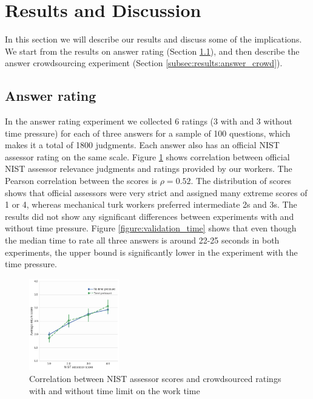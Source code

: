 \documentclass[11pt,letterpaper]{article}
\begin{document}
\section{Results and Discussion}
\label{sec:results}

In this section we will describe our results and discuss some of the implications.
We start from the results on answer rating (Section \ref{subsec:results:answer_rating}), and then describe the answer crowdsourcing experiment (Section \ref{subsec:results:answer_crowd}).

\subsection{Answer rating}
\label{subsec:results:answer_rating}

In the answer rating experiment we collected 6 ratings (3 with and 3 without time pressure) for each of three answers for a sample of 100 questions, which makes it a total of 1800 judgments.
Each answer also has an official NIST assessor rating on the same scale.
Figure \ref{figure:score_correlation} shows correlation between official NIST assessor relevance judgments and ratings provided by our workers.
The Pearson correlation between the scores is $\rho=0.52$.
The distribution of scores shows that official assessors were very strict and assigned many extreme scores of 1 or 4, whereas mechanical turk workers preferred intermediate 2s and 3s.
The results did not show any significant differences between experiments with and without time pressure.
Figure \ref{figure:validation_time} shows that even though the median time to rate all three answers is around 22-25 seconds in both experiments, the upper bound is significantly lower in the experiment with the time pressure.

\begin{figure}[t!]
	\centering
	\includegraphics[width=0.35\textwidth]{img/score_correlation}
	\caption{Correlation between NIST assessor scores and crowdsourced ratings with and without time limit on the work time}
	\label{figure:score_correlation}
\end{figure}
\end{document}
